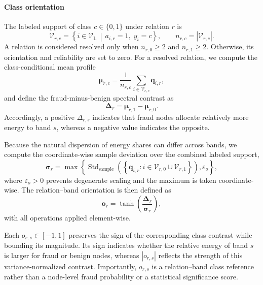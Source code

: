 \documentclass[10pt,journal]{IEEEtran}
\begin{document}
\paragraph{Class orientation}
The labeled support of class $c\in\{0,1\}$ under relation $r$ is
\begin{equation}
\mathcal{V}_{r,c}
=
\left\{
i\in\mathcal{V}_{\mathrm L}
\,\middle|\,
a_{i,r}=1,\; y_i=c
\right\},
\qquad
n_{r,c}=|\mathcal{V}_{r,c}|.
\label{eq:relation_support}
\end{equation}
A relation is considered resolved only when
$n_{r,0}\ge2$ and $n_{r,1}\ge2$.
Otherwise, its orientation and reliability are set to zero.
For a resolved relation, we compute the class-conditional mean profile
\begin{equation}
\boldsymbol{\mu}_{r,c}
=
\frac{1}{n_{r,c}}
\sum_{i\in\mathcal{V}_{r,c}}
\mathbf{q}_{i,r},
\label{eq:class_profile}
\end{equation}
and define the fraud-minus-benign spectral contrast as
\begin{equation}
\boldsymbol{\Delta}_r
=
\boldsymbol{\mu}_{r,1}
-
\boldsymbol{\mu}_{r,0}.
\label{eq:class_contrast}
\end{equation}
Accordingly, a positive $\Delta_{r,s}$ indicates that fraud nodes allocate
relatively more energy to band $s$, whereas a negative value indicates the
opposite.

Because the natural dispersion of energy shares can differ across bands,
we compute the coordinate-wise sample deviation over the combined labeled
support,
\begin{equation}
\boldsymbol{\sigma}_r
=
\max\left\{
\operatorname{Std}_{\mathrm{sample}}
\left(
\left\{
\mathbf{q}_{i,r}
:
i\in
\mathcal{V}_{r,0}\cup\mathcal{V}_{r,1}
\right\}
\right),
\varepsilon_o
\right\},
\label{eq:orientation_scale}
\end{equation}
where $\varepsilon_o>0$ prevents degenerate scaling and the maximum is taken
coordinate-wise. The relation--band orientation is then defined as
\begin{equation}
\mathbf{o}_r
=
\tanh\left(
\frac{
\boldsymbol{\Delta}_r
}{
\boldsymbol{\sigma}_r
}
\right),
\label{eq:orientation}
\end{equation}
with all operations applied element-wise.

Each $o_{r,s}\in[-1,1]$ preserves the sign of the corresponding class contrast
while bounding its magnitude. Its sign indicates whether the relative energy
of band $s$ is larger for fraud or benign nodes, whereas $|o_{r,s}|$ reflects
the strength of this variance-normalized contrast. Importantly,
$o_{r,s}$ is a relation--band class reference rather than a node-level fraud
probability or a statistical significance score.
\end{document}
